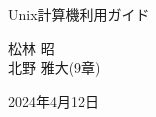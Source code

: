 \documentclass[main]{subfiles}
\begin{document}
\begin{titlepage}
    \vspace*{0.25\textheight} %

    \fontsize{25pt}{25pt} \selectfont
    \centering
    Unix計算機利用ガイド
    \vspace{25pt}
    \fontsize{14pt}{14pt} \selectfont

    \centering
    松林 昭 \\
    \vspace{7pt}
    北野 雅大(9章)\\
    \vspace{14pt}

    2024年4月12日\\
    \normalsize
\end{titlepage}
\end{document}
